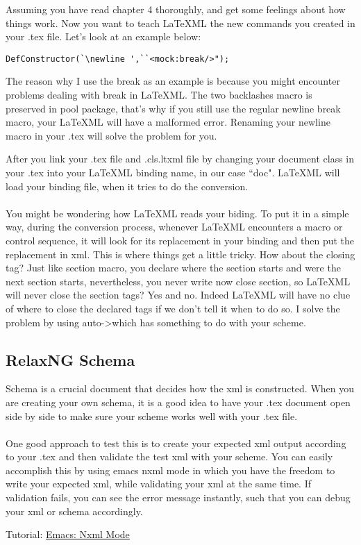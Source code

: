 \documentclass{book}
\begin{document}
Assuming you have read chapter 4 thoroughly, and get some feelings about how things work. Now you want to teach \LaTeX ML the new commands
you created in your .tex file. Let's look at an example below:\\

\begin{lstlisting}
DefConstructor(`\newline ',``<mock:break/>");
\end{lstlisting}

The reason why I use the break as an example  is because you might encounter problems dealing with break in \LaTeX ML. The two backlashes macro is preserved in pool package, that's why if you still use the regular newline break macro, your \LaTeX ML will have a malformed error. Renaming your newline macro in your .tex will solve the problem for you.

After you link your .tex file and .cls.ltxml file by changing your document class in your .tex into your \LaTeX ML binding name, in our case ``doc". \LaTeX ML will load your binding file, when it tries to do the conversion.\\ \\
You might be wondering how \LaTeX ML reads your biding. To put it in a simple way, during the conversion process, whenever \LaTeX ML encounters a macro or control sequence, it will look for its replacement in your binding and then put the replacement in xml. This is where things get a little tricky. How about the closing tag? Just like section macro, you declare where the section starts and were the next section starts, nevertheless, you never write now close section, so \LaTeX ML will never close the section tags? Yes and no. Indeed \LaTeX ML will have no clue of where to close the declared tags if we don't tell it when to do so. I solve the problem by using auto-\textgreater which has something to do with your scheme.

\subsection{RelaxNG Schema}
Schema is a crucial document that decides how the xml is constructed. When you are creating your own schema, it is a good idea to have your .tex document open side by side to make sure your scheme works well with your 
.tex file. \\ \\
One good approach to test this is to create your expected xml output according to your .tex and then validate the 
test xml with your scheme. You can easily accomplish this by using emacs nxml mode in which you have the freedom 
to write your expected xml, while validating your xml at the same time. If validation fails, you can see the error message instantly, such that you can debug your xml or schema accordingly.
\begin{tcolorbox}
Tutorial: \href{http://www.emacswiki.org/emacs/NxmlMode}{Emacs: Nxml Mode} 
\end{tcolorbox} 
\end{document}
